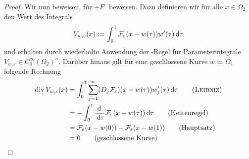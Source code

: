 \begin{proof}
  Wir nun beweisen, für $\div F^\varepsilon$ beweisen.
  Dazu definieren wir für alle $x\in\Omega_2$ den Wert des Integrals
  $$
  V_{w,\varepsilon}(x) := \int_0^1 \mathcal{F}_\varepsilon(x - w(\tau))w'(\tau)\, {\operatorname{d}\!{\tau}}
  $$
  und erhalten durch wiederholte Anwendung der \leibniz\hyp{}Regel für Parameterintegrale $ V_{w,\varepsilon} \in C_0^\infty(\Omega_2)^n$.
  Darüber hinaus gilt für eine geschlossene Kurve $w$ in $\overline\Omega_1$ folgende Rechnung
  \begingroup
  \addtolength{\jot}{0.5em}
  \begin{align*}
    \div V_{w,\varepsilon}(x) 
    &= \int_0^1 \sum_{j=1}^n (D_j \mathcal{F}_\varepsilon)(x - w(\tau))w_j'(\tau) \d\tau \tag{\leibniz}\\
    &= -\int_0^1 \frac{\d\ }{\d\tau}\mathcal{F}_\varepsilon(x - w(\tau)) \d\tau \tag{Kettenregel}\\
    &= \mathcal{F}_\varepsilon(x - w(0)) - \mathcal{F}_\varepsilon(x - w(1)) \tag{Hauptsatz}\\
    &= 0 \tag{geschlossene Kurve}
  \end{align*}
  \endgroup


\end{proof}
